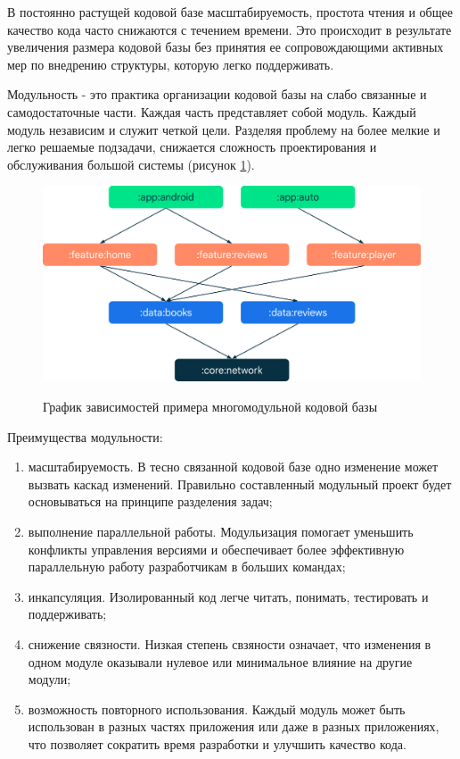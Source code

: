 В постоянно растущей кодовой базе масштабируемость, простота чтения и общее качество кода часто снижаются с течением времени. Это происходит в результате увеличения размера кодовой базы без принятия ее сопровождающими активных мер по внедрению структуры, которую легко поддерживать. 

Модульность - это практика организации кодовой базы на слабо связанные и самодостаточные части. Каждая часть представляет собой модуль. Каждый модуль независим и служит четкой цели. Разделяя проблему на более мелкие и легко решаемые подзадачи, снижается сложность проектирования и обслуживания большой системы (рисунок \ref{fig:modul_graph}).

\begin{figure}[h!]
    \begin{center}
        \includegraphics[width=0.95\hsize]{fig/modul_graph.png}\\[2mm]
        \caption{График зависимостей примера многомодульной кодовой базы}\label{fig:modul_graph}
    \end{center}
\end{figure}

Преимущества модульности:

\begin{enumerate}
    \item масштабируемость. В тесно связанной кодовой базе одно изменение может вызвать каскад изменений. Правильно составленный модульный проект будет основываться на принципе разделения задач;
    \item выполнение параллельной работы. Модульизация помогает уменьшить конфликты управления версиями и обеспечивает более эффективную параллельную работу разработчикам в больших командах;
    \item инкапсуляция. Изолированный код легче читать, понимать, тестировать и поддерживать;
    \item снижение связности. Низкая степень свзяности означает, что изменения в одном модуле оказывали нулевое или минимальное влияние на другие модули;
    \item возможность повторного использования. Каждый модуль может быть использован в разных частях приложения или даже в разных приложениях, что позволяет сократить время разработки и улучшить качество кода.
\end{enumerate}



